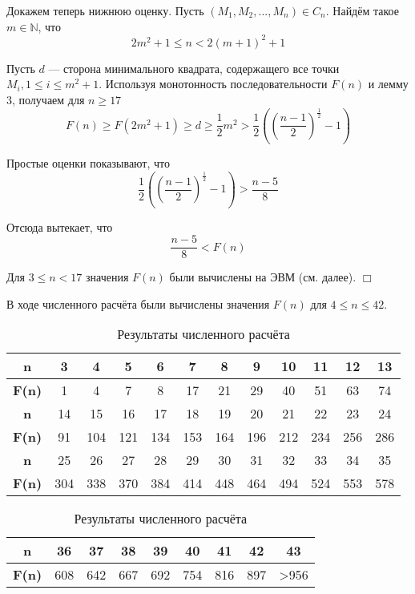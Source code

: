 \documentclass[a4paper,14pt]{article} %
\begin{document}
Докажем теперь нижнюю оценку.
Пусть $\left(M_1, M_2, ..., M_n\right) \in C_n$.
Найдём такое $m\in \mathbb{N}$, что
$$
2m^2+1 \leq n < 2(m+1)^2 +1
$$

Пусть $d$ --- сторона минимального квадрата, содержащего все точки $M_i, 1\leq i \leq m^2+1$.
Используя монотонность последовательности $F(n)$ и лемму 3, получаем для $n\geq 17$
$$
F(n) \geq F\left(2m^2+1\right)\geq d \geq \frac{1}{2}m^2 > \frac{1}{2}\left(\left(\frac{n-1}{2}\right)^\frac{1}{2} - 1 \right)
$$

Простые оценки показывают, что
$$
\frac{1}{2}\left(\left(\frac{n-1}{2}\right)^\frac{1}{2} -1 \right) > \frac{n-5}{8}
$$

Отсюда вытекает, что
$$
\frac{n-5}{8}<F(n)
$$

Для $3 \leq n < 17$ значения $F(n)$ были вычислены на ЭВМ (см. далее).
$\Box$


В ходе численного расчёта были вычислены значения $F(n)$ для $4\leq n \leq 42$.

\begin{table}[H]
\caption{Результаты численного расчёта}
\label{tabular:pc_counted}
\begin{center}
\begin{tabular}{|c|c|c|c|c|c|c|c|c|c|c|c|}
\hline
\textbf{n}    &  3 & 4 & 5 & 6 &  7 &  8 &  9 & 10 & 11 & 12 & 13 \\
\hline
\textbf{F(n)} &  1 & 4 & 7 & 8 & 17 & 21 & 29 & 40 & 51 & 63 & 74  \\
\hline
\hline
\textbf{n}    &  14 &  15 &  16 &  17 &  18 &  19 &  20 &  21 &  22 &  23 &  24 \\
\hline
\textbf{F(n)} &  91 & 104 & 121 & 134 & 153 & 164 & 196 & 212 & 234 & 256 & 286  \\
\hline
\hline
\textbf{n}    &  25 &  26 &  27 &  28 &  29 &  30 &  31 &  32 &  33 &  34 &  35 \\
\hline
\textbf{F(n)} & 304 & 338 & 370 & 384 & 414 & 448 & 464 & 494 & 524 & 553 & 578  \\
\hline
\end{tabular}
\begin{tabular}{|c|c|c|c|c|c|c|c|c|}
\hline
\textbf{n}    &  36 &  37 &  38 &  39 &  40 &  41 &  42 &  43  \\
\hline
\textbf{F(n)} & 608 & 642 & 667 & 692 & 754 & 816 & 897 & >956  \\
\hline
\end{tabular}
\end{center}
\end{table}
\end{document}
